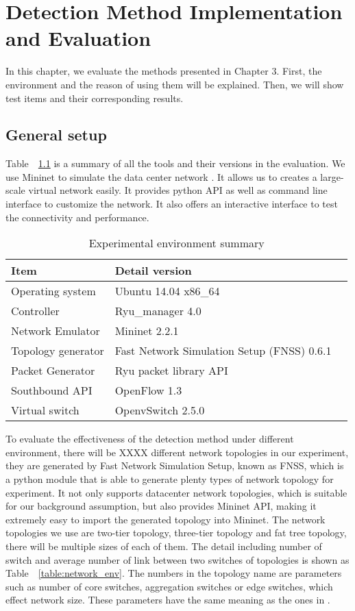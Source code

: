 \chapter{Detection Method Implementation and Evaluation}
In this chapter, we evaluate the methods presented in Chapter 3. First, the environment and the reason of using them will be explained. Then, we will show test items and their corresponding results.

\section{General setup}
Table~~\ref{table:Experiment_table} is a summary of all the tools and their versions in the evaluation. We use Mininet to simulate the data center network \cite{Mininet}. It allows us to creates a large-scale virtual network easily. It provides python API as well as command line interface to customize the network. It also offers an interactive interface to test the connectivity and performance.

\begin{table}[H]
\centering
\caption{Experimental environment summary}
\begin{tabular}{|l|p{4cm}|p{4.5cm}}
\hline Item & Detail version \\
\hline Operating system & Ubuntu 14.04 x86\_64 \\
\hline Controller & Ryu\_manager 4.0 \\
\hline Network Emulator & Mininet 2.2.1 \\
\hline Topology generator & Fast Network Simulation Setup (FNSS) 0.6.1\\
\hline Packet Generator & Ryu packet library API \\
\hline Southbound API & OpenFlow 1.3 \\
\hline Virtual switch & OpenvSwitch 2.5.0 \\
\hline 
\end{tabular}
\label{table:Experiment_table}
\end{table}

To evaluate the effectiveness of the detection method under different environment, there will be XXXX different network topologies in our experiment, they are generated by Fast Network Simulation Setup, known as FNSS, which is a python module that is able to generate plenty types of network topology for experiment. It not only supports datacenter network topologies, which is suitable for our background assumption, but also provides Mininet API, making it extremely easy to import the generated topology into Mininet. The network topologies we use are two-tier topology, three-tier topology and fat tree topology, there will be multiple sizes of each of them. The detail including number of switch and average number of link between two switches of topologies is shown as Table~~\ref{table:network_env}. The numbers in the topology name are parameters such as number of core switches, aggregation switches or edge switches, which effect network size. These parameters have the same meaning as the ones in \cite{FNSS}.

